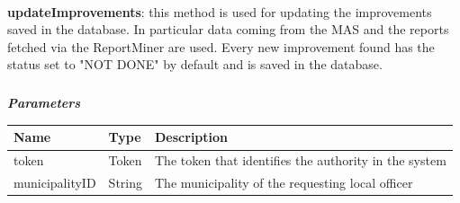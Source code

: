 					\paragraph{}
							\textbf{updateImprovements}: this method is used for updating the improvements saved in the database. In particular data coming from the MAS and the reports fetched via the ReportMiner are used. Every new improvement found has the status set to "NOT DONE" by default and is saved in the database.
							\subparagraph{}
							\textit{\textbf{Parameters}}
								\begin{table}[!h]
									\begin{tabular}{L{0.2\textwidth}L{0.2\textwidth}L{0.2\textwidth}}
										\toprule
										Name & Type & Description \\
										\midrule
								  		token & Token & The token that identifies the authority in the system \\
								  		municipalityID & String & The municipality of the requesting local officer \\
								 		\bottomrule
									\end{tabular}
								\end{table}
							
